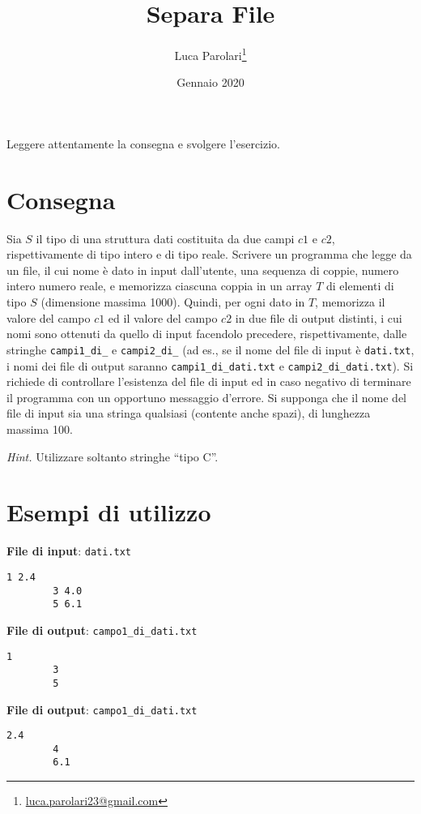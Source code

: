 \documentclass[addpoints,12pt,answers]{exam}
\author{Luca Parolari\footnote{\href{mailto:luca.parolari23@gmail.com}{luca.parolari23@gmail.com}}}
\begin{document}
    
    \title{Separa File}
    \date{Gennaio 2020}
    
    \maketitle
    
    Leggere attentamente la consegna e svolgere l'esercizio.
    
    \section{Consegna}
    
    Sia $S$ il tipo di una struttura dati costituita da due campi $c1$ e $c2$, rispettivamente di tipo intero e di tipo reale. Scrivere un programma che legge da un file, il cui nome è dato in input dall'utente, una sequenza di coppie, numero intero numero reale, e memorizza ciascuna coppia in un array $T$ di elementi di tipo $S$ (dimensione massima 1000). Quindi, per ogni dato in $T$, memorizza il valore del campo $c1$ ed il valore del campo $c2$ in due file di output distinti, i cui nomi sono ottenuti da quello di input facendolo precedere, rispettivamente, dalle stringhe \verb|campi1_di_| e \verb|campi2_di_| (ad es., se il nome del file di input è \texttt{dati.txt}, i nomi dei file di output saranno \verb|campi1_di_dati.txt| e \verb|campi2_di_dati.txt|). Si richiede di controllare l'esistenza del file di input ed in caso negativo di terminare il programma con un opportuno messaggio d'errore. Si supponga che il nome del file di input sia una stringa qualsiasi (contente anche spazi), di lunghezza massima 100. 
    
    \emph{Hint.} Utilizzare soltanto stringhe ``tipo C''.
    
    \section{Esempi di utilizzo}
    
    \noindent\textbf{File di input}: \texttt{dati.txt}
	\begin{lstlisting}[style=verbatim]
		1 2.4
		3 4.0
		5 6.1
	\end{lstlisting}
	
	\noindent\textbf{File di output}: \verb|campo1_di_dati.txt|
	\begin{lstlisting}[style=verbatim]
		1
		3
		5
	\end{lstlisting}
	
	\noindent\textbf{File di output}: \verb|campo1_di_dati.txt|
	\begin{lstlisting}[style=verbatim]
		2.4
		4
		6.1
	\end{lstlisting}
    
\end{document}
